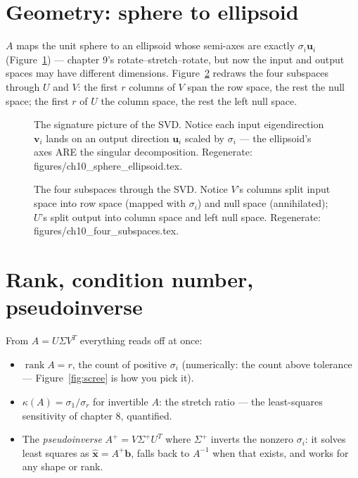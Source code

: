 \section{Geometry: sphere to ellipsoid}\label{sec:svd-geom}

$A$ maps the unit sphere to an ellipsoid whose semi-axes are exactly
$\sigma_i\mathbf u_i$ (Figure~\ref{fig:sphere-ell}) --- chapter 9's
rotate--stretch--rotate, but now the input and output spaces may have
different dimensions. Figure~\ref{fig:four-subs} redraws the four
subspaces through $U$ and $V$: the first $r$ columns of $V$ span the row
space, the rest the null space; the first $r$ of $U$ the column space,
the rest the left null space.

\begin{figure}[htbp]
\centering

\caption{The signature picture of the SVD. Notice each input
eigendirection $\mathbf v_i$ lands on an output direction $\mathbf u_i$
scaled by $\sigma_i$ --- the ellipsoid's axes ARE the singular
decomposition. Regenerate:
\ttfamily figures/ch10\_sphere\_ellipsoid.tex.}
\label{fig:sphere-ell}
\end{figure}

\begin{figure}[htbp]
\centering

\caption{The four subspaces through the SVD. Notice $V$'s columns split
input space into row space (mapped with $\sigma_i$) and null space
(annihilated); $U$'s split output into column space and left null space.
Regenerate: \ttfamily figures/ch10\_four\_subspaces.tex.}
\label{fig:four-subs}
\end{figure}

\section{Rank, condition number, pseudoinverse}\label{sec:svd-rank}

From $A=U\Sigma V^{T}$ everything reads off at once:

\begin{itemize}
\item $\operatorname{rank}A=r$, the count of positive $\sigma_i$
(numerically: the count above tolerance --- Figure~\ref{fig:scree} is how
you pick it).
\item $\kappa(A)=\sigma_1/\sigma_r$ for invertible $A$: the stretch ratio
--- the least-squares sensitivity of chapter 8, quantified.
\item The \emph{pseudoinverse}
$A^{+}=V\Sigma^{+}U^{T}$ where $\Sigma^{+}$ inverts the nonzero
$\sigma_i$: it solves least squares as $\hat{\mathbf x}=A^{+}\mathbf b$,
falls back to $A^{-1}$ when that exists, and works for any shape or rank.
\end{itemize}


